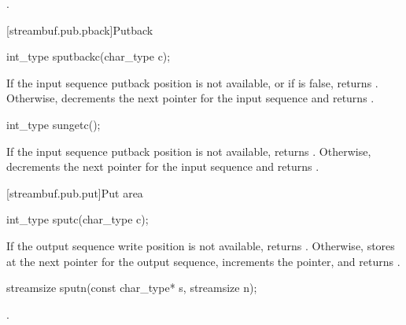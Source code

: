 \begin{itemdescr}
\pnum
\returns
{}.
\end{itemdescr}

[streambuf.pub.pback]{Putback}

%
\begin{itemdecl}
int_type sputbackc(char_type c);
\end{itemdecl}

\begin{itemdescr}
\pnum
\returns
If the input sequence putback position is not available, or
if
is false, returns
.
Otherwise, decrements the next pointer for the input sequence and
returns
.
\end{itemdescr}

%
\begin{itemdecl}
int_type sungetc();
\end{itemdecl}

\begin{itemdescr}
\pnum
\returns
If the input sequence putback position is not available,
returns
.
Otherwise, decrements the next pointer for the input sequence and
returns
.
\end{itemdescr}

[streambuf.pub.put]{Put area}

%
\begin{itemdecl}
int_type sputc(char_type c);
\end{itemdecl}

\begin{itemdescr}
\pnum
\returns
If the output sequence write position is not available,
returns
.
Otherwise, stores  at the next pointer for the output sequence,
increments the pointer, and
returns
.
\end{itemdescr}

%
\begin{itemdecl}
streamsize sputn(const char_type* s, streamsize n);
\end{itemdecl}

\begin{itemdescr}
\pnum
\returns
{}.
\end{itemdescr}

